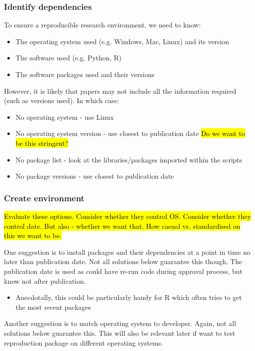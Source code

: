 \subsubsection{Identify dependencies}
\timeyes

To ensure a reproducible research environment, we need to know:
\begin{itemize}
    \item The operating system used (e.g. Windows, Mac, Linux) and its version 
    \item The software used (e.g. Python, R)
    \item The software packages used and their versions\autocite{the_turing_way_community_turing_2022}
\end{itemize}

However, it is likely that papers may not include all the information required (such as versions used). In which case:
\begin{itemize}
    \item No operating system - use Linux
    \item No operating system version - use closest to publication date \hl{Do we want to be this stringent?}
    \item No package list - look at the libraries/packages imported within the scripts
    \item No package versions - use closest to publication date
\end{itemize}

\subsubsection{Create environment}
\timeyes

\hl{Evaluate these options. Consider whether they control OS. Consider whether they control date. But also - whether we want that. How casual vs. standardised on this we want to be.}

One suggestion is to install packages and their dependencies at a point in time no later than publication date. Not all solutions below guarantee this though. The publication date is used as could have re-run code during approval process, but know not after publication.
\begin{itemize}
    \item Anecdotally, this could be particularly handy for R which often tries to get the most recent packages
\end{itemize}

Another suggestion is to match operating system to developer. Again, not all solutions below guarantee this. This will also be relevant later if want to test reproduction package on different operating systems.

